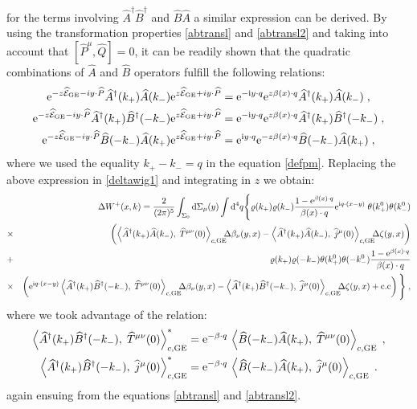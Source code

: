 \documentclass[prd,superscriptaddress,nofootinbib,notitlepage]{revtex4-1}
\def\wT{{\widehat T}}
\def\wj{{\widehat j}}
\def\wP{{\widehat P}}
\def\wA{{\widehat A}}
\def\wB{{\widehat B}}
\def\wQ{{\widehat Q}}
\def\wE{{\widehat{\cal E}}}
\def\wA{\widehat A}
\def\wAd{\widehat A^{\dagger}}
\def\wB{\widehat B}
\def\wBd{\widehat B^{\dagger}}
\def\wQ{\widehat Q}
\newcommand{\e}{{\rm e}}
\newcommand{\di}{{\rm d}}
\newcommand{\ii}{{\rm i}}
\begin{document}
%
for the terms involving $\wAd\wBd$ and $\wB\wA$ a similar expression can be derived. By using the transformation properties \eqref{abtransl} and \eqref{abtransl2} and taking into account that $[\wP^\mu,\wQ]=0$, it can be readily shown that the 
quadratic combinations of $\wA$ and $\wB$ operators fulfill the following relations:
%
\begin{equation*}
 \begin{split}
\e^{-z\wE_{\rm GE}-iy\cdot\wP}\wAd(k_+)\wA(k_-)\e^{z\wE_{\rm GE}+iy\cdot\wP} &=\e^{-\ii y\cdot q }\e^{z\beta(x)\cdot q}\wAd(k_+)\wA(k_-)\;,\\
\e^{-z\wE_{\rm GE}-iy\cdot\wP}\wAd(k_+)\wBd(-k_-)\e^{z\wE_{\rm GE}+iy\cdot\wP} &=\e^{-\ii y\cdot q }\e^{z\beta(x)\cdot q}\wAd(k_+)\wBd(-k_-)\;,\\
\e^{-z\wE_{\rm GE}-iy\cdot\wP}\wB(-k_-)\wA(k_+)\e^{z\wE_{\rm GE}+iy\cdot\wP} &=\e^{\ii y\cdot q }\e^{-z\beta(x)\cdot q}\wB(-k_-)\wA(k_+)\;,
 \end{split}
\end{equation*}
%
where we used the equality $k_+-k_-=q$ in the equation \eqref{defpm}. Replacing the above expression in 
\eqref{deltawig1} and integrating in $z$ we obtain:
%
\begin{eqnarray}\label{deltawig2}
&&\Delta W^+(x,k) =\frac{2}{(2\pi)^5} \int_{\Sigma_{0}} \di \Sigma_{\mu}(y) 
\int \di^{4}q\Bigg\{ \varrho(k_+)\varrho(k_-)\frac{1 -\e^{\beta(x)\cdot q}}{\beta(x) \cdot q}
\e^{\ii q\cdot (x-y)}\; \theta(k_+^0)\theta(k_-^0)\nonumber \\
& \times& \left( \left\langle \wAd (k_+) \wA(k_-),\; \wT^{\mu\nu}(0) 
\right\rangle_{c,{\rm GE}} \!\!\! \Delta\beta_\nu(y,x) - \left\langle \wAd (k_+) \wA(k_-),\; \wj^{\mu}(0) 
\right\rangle_{c,{\rm GE}} \!\!\! \Delta\zeta(y,x) \right) \\
&+& \varrho(k_+) \varrho(-k_-) \theta(k_+^0)\theta(-k_-^0)\frac{1-\e^{\beta(x)\cdot q}}{\beta(x)\cdot q}
\nonumber\\
&\times&\left(\e^{\ii q\cdot\left(x-y\right)} \left\langle \wAd (k_+) \wBd(-k_-),\; \wT^{\mu\nu}(0) 
\right\rangle_{c,{\rm GE}} \!\!\! \Delta\beta_\nu(y,x) - \left\langle \wAd (k_+) \wBd(-k_-),\; \wj^{\mu}(0) 
\right\rangle_{c,{\rm GE}} \!\!\! \Delta\zeta(y,x) +{\rm c.c}\right)\Bigg\}\;,\nonumber
\end{eqnarray}
%
where we took advantage of the relation:
%
\begin{equation*}
    \begin{split}
        \left\langle \wAd (k_+) \wBd(-k_-),\; \wT^{\mu\nu}(0) 
\right\rangle^*_{c,{\rm GE}}&=
\e^{-\beta\cdot q}
\, \left\langle \wB (-k_-) \wA(k_+),\; \wT^{\mu\nu}(0) 
\right\rangle_{c,{\rm GE}}\;,\\
\left\langle \wAd (k_+) \wBd(-k_-),\; \wj^{\mu}(0) 
\right\rangle^*_{c,{\rm GE}}&=
\e^{-\beta\cdot q} \, \left\langle \wB (-k_-) \wA(k_+),\; \wj^{\mu}(0) 
\right\rangle_{c,{\rm GE}}\;.
    \end{split}
\end{equation*}
%
again ensuing from the equations \eqref{abtransl} and \eqref{abtransl2}.
\end{document}
